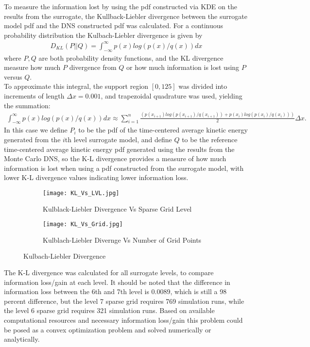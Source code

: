 \documentclass{article}
\begin{document}
To measure the information lost by using the pdf constructed via KDE on the results from the surrogate, the Kullback-Liebler divergence between the surrogate model pdf and the DNS constructed pdf was calculated. For a continuous probability distribution the Kulbach-Liebler divergence is given by
\begin{align*}
D_{KL}(P||Q) = \int_{-\infty}^{\infty} p(x) log(p(x)/q(x))dx
\end{align*}
where $P,Q$ are both probability density functions, and the KL divergence measure how much $P$ divergence from $Q$ or how much information is lost using $P$ versus $Q$.\\
To approximate this integral, the support region $[0, 125]$ was divided into increments of length $\Delta x = 0.001$, and trapezoidal quadrature was used, yielding the summation:
\begin{align*}
\int_{-\infty}^{\infty} p(x) log(p(x)/q(x))dx \approx \sum_{i=1}^n \frac{(p(x_{i+1})log(p(x_{i+1})/q(x_{i+1})) + p(x_{i})log(p(x_{i})/q(x_{i})))}{2}\Delta x.
\end{align*}
In this case we define $P_i$ to be the pdf of the time-centered average kinetic energy generated from the $i$th level surrogate model, and define $Q$ to be the reference time-centered average kinetic energy pdf generated using the results from the Monte Carlo DNS, so the K-L divergence provides a measure of how much information is lost when using a pdf constructed from the surrogate model, with lower K-L divergence values indicating lower information loss.\\
\begin{figure}[h!]
\centering
	\begin{subfigure}[b]{0.5\linewidth}
		\texttt{[image: KL\_Vs\_LVL.jpg]}
		\caption{Kulblack-Liebler Divergence Vs Sparse Grid Level}
	\end{subfigure}
	\begin{subfigure}[b]{0.5\linewidth}
		\texttt{[image: KL\_Vs\_Grid.jpg]}
	\caption{Kulblach-Liebler Divernge Vs Number of Grid Points}
	\end{subfigure}
	\caption{Kulbach-Liebler Divergence}
		\label{fig:K-L}
\end{figure}
The K-L divergence was calculated for all surrogate levels, to compare information loss/gain at each level. It should be noted that the difference in information loss between the 6th and 7th level is $0.0089$, which is still a 98 percent difference, but the level 7 sparse grid requires 769 simulation runs, while the level 6 sparse grid requires 321 simulation runs. Based on available computational resources and necessary information loss/gain this problem could be posed as a convex optimization problem and solved numerically or analytically.
\end{document}
